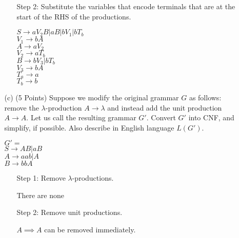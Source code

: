 \documentclass[12pt]{article}
\begin{document}
\begin{spacing}{1.5}
\begin{enumerate}
\begin{enumerate}
\begin{enumerate}
                                    \item[Step 2:] Substitute the variables that encode terminals that are at the start of the RHS of the productions.

                                          $S \rightarrow aV_2B | aB | bV_1 | bT_b$ \\
                                          $V_1 \rightarrow bA$ \\
                                          $A \rightarrow aV_2$ \\
                                          $V_2 \rightarrow aT_b$ \\
                                          $B \rightarrow bV_3 | bT_b$ \\
                                          $V_3 \rightarrow bA$ \\
                                          $T_a \rightarrow a$ \\
                                          $T_b \rightarrow b$
                              \end{enumerate}

                              \newpage
                        \item[(c)] (5 Points) Suppose we modify the original grammar $G$ as follows: remove the $\lambda \text{-production}$ $A \rightarrow \lambda$ and instead add the unit production $A \rightarrow A$. Let us call the resulting grammar $G'$. Convert $G'$ into CNF, and simplify, if possible. Also describe in English language $L(G')$.

                              $G'= $ \\
                              $S \rightarrow AB | aB$ \\
                              $A \rightarrow aab | A$ \\
                              $B \rightarrow bbA$

                              \begin{enumerate}
                                    \item[Step 1:] Remove $\lambda$-productions.

                                          There are none

                                    \item[Step 2:] Remove unit productions.

                                          $A \implies A$ can be removed immediately.


\end{enumerate}
\end{enumerate}
\end{enumerate}
\end{spacing}
\end{document}
